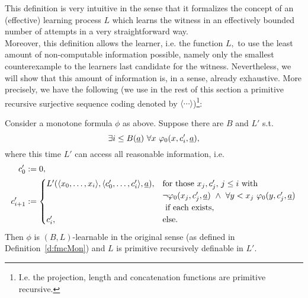 This definition is very intuitive in the sense that it formalizes the concept of an (effective) learning process $L$ which learns the witness in an effectively bounded number of attempts in a very straightforward way.\\
Moreover, this definition allows the learner, i.e. the function $L,$ to use the least amount of non-computable information possible, namely only the smallest counterexample to the learners last candidate for the witness. 
Nevertheless, we will show that this amount of information is, in a sense, 
already exhaustive. More precisely, we have the following (we use in the 
rest of this section a primitive recursive surjective sequence coding 
denoted by $\langle\cdots\rangle$)\footnote{I.e. the projection, length and 
concatenation functions are primitive recursive.}:
\begin{prop}\label{p:allx}
Consider a monotone formula $\phi$ as above. Suppose there are $B$ and $L'$ s.t.
\[ \exists i\leq B(\tup a)\ \forall x\ \phi_0(x,c'_i,\tup a),\] where this 
time $L'$ can access all reasonable information, i.e.
\begin{align*}
c'_0&:=0,\\
c'_{i+1}&:=
\begin{cases}
L'(\langle x_0,\ldots,x_i\rangle, \langle c'_0,\ldots,c'_i\rangle,\tup a), &\text{for those $x_j,c'_j$, $j\leq i$ with }\\
 &\neg\phi_0(x_j,c'_j,\tup a)\ \wedge\ \forall y<x_j\ \phi_0(y,c'_j,\tup a)\\
  &\text{ if each exists},\\
c'_i, &\Telse.
\end{cases}
\end{align*}
Then $\phi$ is $(B,L)$-learnable in the original sense (as defined in Definition~\ref{d:fmcMon}) and $L$ is primitive recursively definable in $L'$.
\end{prop}
